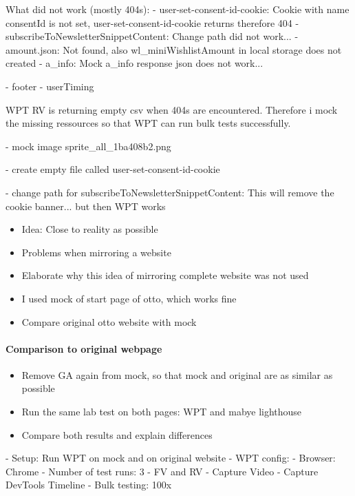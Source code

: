 What did not work (mostly 404s):
- user-set-consent-id-cookie: Cookie with name consentId is not set, user-set-consent-id-cookie returns therefore 404
- subscribeToNewsletterSnippetContent: Change path did not work...
- amount.json: Not found, also wl\_miniWishlistAmount in local storage does not created
- a\_info: Mock a\_info response json does not work...

- footer
- userTiming


WPT RV is returning empty csv when 404s are encountered.
Therefore i mock the missing ressources so that WPT can run bulk tests successfully.

- mock image sprite\_all\_1ba408b2.png

- create empty file called user-set-consent-id-cookie

- change path for subscribeToNewsletterSnippetContent: This will remove the cookie banner... but then WPT works



\begin{itemize}
    \item Idea: Close to reality as possible
    \item Problems when mirroring a website
    \item Elaborate why this idea of mirroring complete website was not used
    \item I used mock of start page of otto, which works fine
    \item Compare original otto website with mock
\end{itemize}





\paragraph{Comparison to original webpage}

\begin{itemize}
    \item Remove GA again from mock, so that mock and original are as similar as possible
    \item Run the same lab test on both pages: WPT and mabye lighthouse
    \item Compare both results and explain differences
\end{itemize}



- Setup: Run WPT on mock and on original website
- WPT config:
- Browser: Chrome
- Number of test runs: 3
- FV and RV
- Capture Video
- Capture DevTools Timeline
- Bulk testing: 100x



